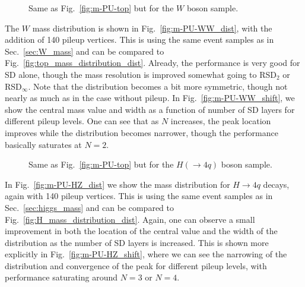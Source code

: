 \documentclass[11pt,a4paper]{article}
\DeclareRobustCommand{\Sec}[1]{Sec.~\ref{#1}}
\DeclareRobustCommand{\Fig}[1]{Fig.~\ref{#1}}
\begin{document}
\begin{figure}[t]
  \centering
  \qquad
  \caption{Same as \Fig{fig:m-PU-top} but for the $W$ boson sample.}
  \label{fig:m-PU-WW}
\end{figure}


The $W$ mass distribution is shown in \Fig{fig:m-PU-WW_dist}, with the addition of 140 pileup vertices.
%
This is using the same event samples as in \Sec{sec:W_mass} and can be compared to \Fig{fig:top_mass_distribution_dist}.
%
Already, the performance is very good for SD alone, though the mass resolution is improved somewhat going to RSD$_2$ or RSD$_\infty$.
%
Note that the distribution becomes a bit more symmetric, though not nearly as much as in the case without pileup.
%
In \Fig{fig:m-PU-WW_shift}, we show the central mass value and width as
a function of number of SD layers for different pileup levels.
%
One can see that as $N$ increases, the peak location improves while
the distribution becomes narrower, though the performance basically saturates at $N = 2$.


\begin{figure}[t]
  \centering
  \qquad
  \caption{Same as \Fig{fig:m-PU-top} but for the $H(\rightarrow4q)$ boson sample.}
  \label{fig:m-PU-HZ}
\end{figure}

In \Fig{fig:m-PU-HZ_dist} we show the mass distribution for $H\rightarrow 4q$ decays, again with 140 pileup vertices.
%
This is using the same event samples as in \Sec{sec:higgs_mass} and can be compared to \Fig{fig:H_mass_distribution_dist}.
%
Again, one can observe a small improvement in both the location of the central value and the width of the distribution as the number of
SD layers is increased.
%
This is shown more explicitly in \Fig{fig:m-PU-HZ_shift}, where we can see the narrowing of the
distribution and convergence of the peak for different pileup levels, with performance saturating around $N = 3$ or $N = 4$.
\end{document}
